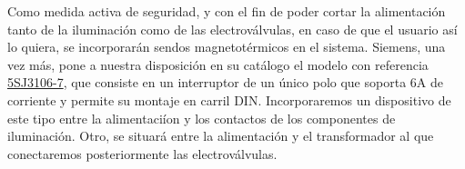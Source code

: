 Como medida activa de seguridad, y con el fin de poder cortar la alimentaci\'on tanto de la iluminaci\'on como de las electrov\'alvulas, en caso de que el usuario as\'i lo quiera, se incorporar\'an sendos magnetot\'ermicos en el sistema. Siemens, una vez m\'as, pone a nuestra disposici\'on en su cat\'alogo el modelo con referencia \hyperref[Magnetotermicos]{5SJ3106-7}, que consiste en un interruptor de un \'unico polo que soporta 6A de corriente y permite su montaje en carril DIN. Incorporaremos un dispositivo de este tipo entre la alimentaci\'ion y los contactos de los componentes de iluminaci\'on. Otro, se situar\'a entre la alimentaci\'on y el transformador al que conectaremos posteriormente las electrov\'alvulas.